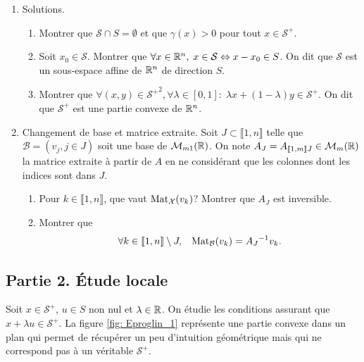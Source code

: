 \begin{enumerate}
  \item Solutions.
  \begin{enumerate}
    \item Montrer que $\mathcal{S} \cap S = \emptyset$ et que $\gamma(x) >0$ pour tout $x\in \mathcal{S}^+$.
    \item Soit $x_0 \in \mathcal{S}$. Montrer que $\forall x\in \mathbb{R}^n, \; x \in \mathcal{S} \Leftrightarrow x- x_0 \in S$.\newline
On dit que $\mathcal{S}$ est un sous-espace affine de $\mathbb{R}^n$ de direction $S$.
    \item Montrer que $\forall (x,y) \in {\mathcal{S}^+}^2, \forall \lambda \in \left[ 0, 1 \right]:\; \lambda x + (1-\lambda)y \in \mathcal{S}^+$. \newline
On dit que $\mathcal{S}^+$ est une partie convexe de $\mathbb{R}^n$.
  \end{enumerate}
  
  \item Changement de base et matrice extraite.\medskip\newline
  Soit $J \subset \llbracket 1, n \rrbracket$ telle que $\mathcal{B} = \left(v_j , j\in J \right)$ soit une base de $\mathcal{M}_{m 1 }(\mathbb{R})$.\newline
  On note $A_J = A_{\llbracket 1,m\rrbracket J} \in \mathcal{M}_m(\mathbb{R})$ la matrice extraite à partir de $A$ en ne considérant que les colonnes dont les indices sont dans $J$. 
  \begin{enumerate}
    \item Pour $k \in \llbracket 1,n\rrbracket$, que vaut $\operatorname{Mat}_{\mathcal{X}}(v_k)$? Montrer que $A_J$ est inversible.
    \item Montrer que 
\[
  \forall k \in \llbracket 1,n \rrbracket \setminus J,\hspace{0.3cm} \operatorname{Mat}_{\mathcal{B}}(v_k) = {A_J}^{-1} v_k.
\]
  \end{enumerate}

\end{enumerate}

\subsection*{Partie 2. \'Etude locale}\noindent
Soit $x \in \mathcal{S}^+$, $u \in S$ non nul et $\lambda \in \mathbb{R}$. On étudie les conditions assurant que $x + \lambda u \in \mathcal{S}^+$.\newline
La figure \ref{fig: Eproglin_1} représente une partie convexe dans un plan qui permet de récupérer un peu d'intuition géométrique mais qui ne correspond pas à un véritable $\mathcal{S}^+$.

